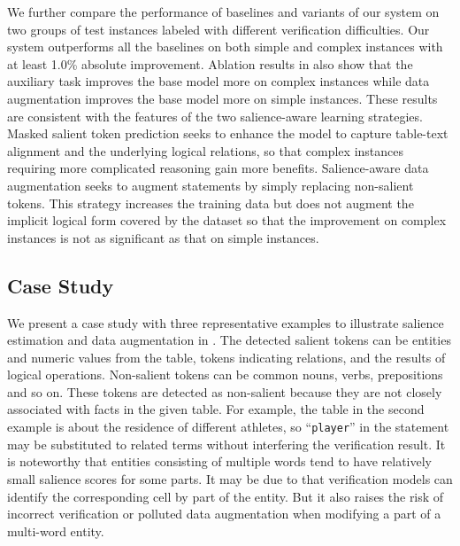 \documentclass[11pt]{article}
\newcommand{\stitle}[1]{\vspace{0.3em} \noindent{\bf #1.}}
\begin{document}
\stitle{Performance on Simple and Complex Instances}
We further compare the performance of baselines and variants of our system on two groups of test instances labeled with different verification difficulties. 
Our system outperforms all the baselines on both simple and complex instances with at least 1.0\% absolute improvement.
Ablation results in  also show that the auxiliary task improves the base model more on complex instances while data augmentation improves the base model more on simple instances.
These results are consistent with the features of the two salience-aware learning strategies.
Masked salient token prediction seeks to enhance the model to capture table-text alignment and the underlying logical relations,
so that complex instances requiring more complicated reasoning gain more benefits.
Salience-aware data augmentation seeks to 
augment statements
by simply replacing non-salient tokens.
This strategy increases the training data but does not augment the implicit logical form covered by the dataset so that the improvement on complex instances is not as significant as that on simple instances.












\subsection{Case Study}
\label{sec:case}


We present a case study with three representative examples to illustrate salience estimation and data augmentation in .
The detected salient tokens can be entities and numeric values from the table, tokens indicating relations, and the results of logical operations.
Non-salient tokens can be common nouns, verbs, prepositions and so on.
These tokens are detected as non-salient because they are not closely associated with facts in the given table.
For example, the table in the second example is about the residence of different athletes, so ``\texttt{player}'' in the statement may be substituted to related terms without interfering the verification result.
It is noteworthy that entities consisting of multiple words tend to have relatively small salience scores for some parts.
It may be due to that verification models can identify the corresponding cell by part of the entity.
But it also raises the risk of incorrect verification or polluted data augmentation when modifying a part of a multi-word entity.
\end{document}
